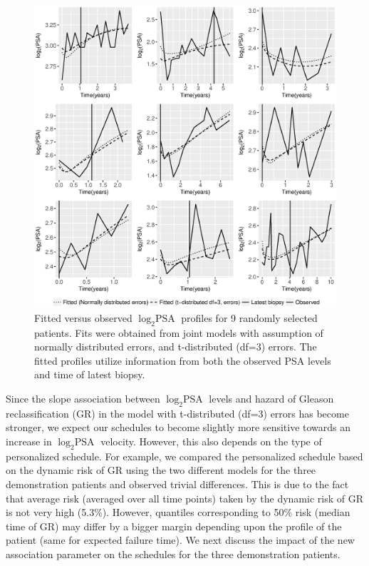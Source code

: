 \begin{enumerate}
    \begin{figure}[!htb]
    \centerline{\includegraphics[width=\columnwidth]{images/model_fit/subject_fittedVsObserved_psa_norm_t3.eps}}
    \caption{Fitted versus observed $\log_2 \mbox{PSA}$ profiles for 9 randomly selected patients. Fits were obtained from joint models with assumption of normally distributed errors, and t-distributed (df=3) errors. The fitted profiles utilize information from both the observed PSA levels and time of latest biopsy.}
    \label{fig : subject_fittedVsObserved_psa_norm_t3}
    \end{figure}

    Since the slope association between $\log_2 \mbox{PSA}$ levels and hazard of Gleason reclassification (GR) in the model with t-distributed (df=3) errors has become stronger, we expect our schedules to become slightly more sensitive towards an increase in $\log_2 \mbox{PSA}$ velocity. However, this also depends on the type of personalized schedule. For example, we compared the personalized schedule based on the dynamic risk of GR using the two different models for the three demonstration patients and observed trivial differences. This is due to the fact that average risk (averaged over all time points) taken by the dynamic risk of GR is not very high (5.3\%). However, quantiles corresponding to 50\% risk (median time of GR) may differ by a bigger margin depending upon the profile of the patient (same for expected failure time). We next discuss the impact of the new association parameter on the schedules for the three demonstration patients.


\end{enumerate}
